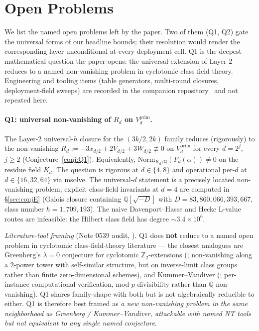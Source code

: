 \documentclass[11pt]{article}
\theoremstyle{definition}
\theoremstyle{remark}
\begin{document}
\section{Open Problems}
\label{sec:open}

\noindent We list the named open problems left by the paper. Two
of them (Q1, Q2) gate the universal forms of our headline bounds;
their resolution would render the corresponding layer unconditional
at every deployment cell. Q1 is the deepest mathematical question
the paper opens: the universal extension of Layer 2 reduces to a
named non-vanishing problem in cyclotomic class field theory.
Engineering and tooling items (table generators, multi-round
closures, deployment-field sweeps) are recorded in the companion
repository~\cite{CompanionRepo} and not repeated here.

\paragraph{Q1: universal non-vanishing of $R_d$ on
$V_d^{\mathrm{prim}}$.}
The Layer-$2$ universal-$h$ closure for the $(3k/2, 2k)$ family
reduces (rigorously) to the non-vanishing
$R_d := -3 x_{d/2} + 2 V_{d/2} + 3 W_{d/2} \not\equiv 0$ on
$V_d^{\mathrm{prim}}$ for every $d = 2^j$, $j \geq 2$
(Conjecture~\ref{conj:Q1}). Equivalently,
$\mathrm{Norm}_{K_d/\mathbb{Q}}(F_d(\alpha)) \neq 0$ on the residue
field $K_d$. The question is rigorous at $d \in \{4, 8\}$ and
operational per-$d$ at $d \in \{16, 32, 64\}$ via msolve. The
universal-$d$ statement is a precisely located non-vanishing
problem; explicit class-field invariants at $d = 4$ are computed
in \S\ref{sec:conjE} (Galois closure containing
$\mathbb{Q}[\sqrt{-D}]$ with $D = 83{,}860{,}066{,}393{,}667$,
class number $h = 1{,}709{,}193$). The naive Davenport--Hasse and
Hecke L-value routes are infeasible: the Hilbert class field has
degree ${\sim} 3.4 \times 10^{6}$.

\emph{Literature-tool framing} (Note 0539 audit, \cite{CompanionRepo}).
Q1 does \textbf{not} reduce to a named open problem in cyclotomic
class-field-theory literature — the closest analogues are Greenberg's
$\lambda = 0$ conjecture for cyclotomic $\mathbb{Z}_2$-extensions
(\cite{Greenberg1976}; non-vanishing along a $2$-power tower with
self-similar structure, but on inverse-limit class groups rather than
finite zero-dimensional schemes), and Kummer--Vandiver
(\cite{KummerVandiver}; per-instance computational verification,
mod-$p$ divisibility rather than $\mathbb{Q}$-non-vanishing). Q1
shares family-shape with both but is not algebraically reducible to
either. Q1 is therefore best framed as \emph{a new non-vanishing
problem in the same neighborhood as Greenberg / Kummer--Vandiver,
attackable with named NT tools but not equivalent to any single
named conjecture}.
\end{document}
